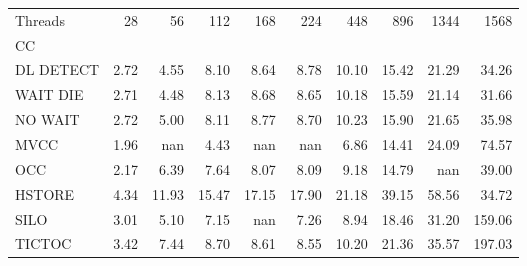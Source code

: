 \begin{tabular}{lrrrrrrrrr}
\toprule
Threads &  28   &  56   &  112  &  168  &  224  &  448  &  896  &  1344 &   1568 \\
CC        &       &       &       &       &       &       &       &       &        \\
\midrule
DL DETECT &  2.72 &  4.55 &  8.10 &  8.64 &  8.78 & 10.10 & 15.42 & 21.29 &  34.26 \\
WAIT DIE  &  2.71 &  4.48 &  8.13 &  8.68 &  8.65 & 10.18 & 15.59 & 21.14 &  31.66 \\
NO WAIT   &  2.72 &  5.00 &  8.11 &  8.77 &  8.70 & 10.23 & 15.90 & 21.65 &  35.98 \\
MVCC      &  1.96 &   nan &  4.43 &   nan &   nan &  6.86 & 14.41 & 24.09 &  74.57 \\
OCC       &  2.17 &  6.39 &  7.64 &  8.07 &  8.09 &  9.18 & 14.79 &   nan &  39.00 \\
HSTORE    &  4.34 & 11.93 & 15.47 & 17.15 & 17.90 & 21.18 & 39.15 & 58.56 &  34.72 \\
SILO      &  3.01 &  5.10 &  7.15 &   nan &  7.26 &  8.94 & 18.46 & 31.20 & 159.06 \\
TICTOC    &  3.42 &  7.44 &  8.70 &  8.61 &  8.55 & 10.20 & 21.36 & 35.57 & 197.03 \\
\bottomrule
\end{tabular}
